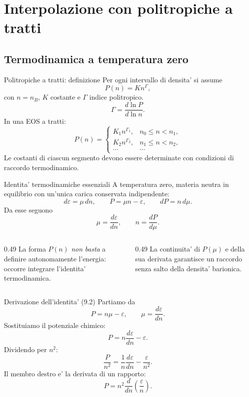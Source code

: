 \section{Interpolazione con politropiche a tratti}
\subsection{Termodinamica a temperatura zero}

\begin{frame}{Politropiche a tratti: definizione}
\small
Per ogni intervallo di densita' si assume
\[
{P(n)=Kn^{\Gamma}},
\]
con $n=n_B$, $K$ costante e $\Gamma$ indice politropico.
\[
\Gamma=\frac{d\ln P}{d\ln n}.
\]
In una EOS a tratti:
\[
P(n)=\begin{cases}
K_1n^{\Gamma_1},&n_0\leq n<n_1,\\
K_2n^{\Gamma_2},&n_1\leq n<n_2,\\
\cdots&\cdots
\end{cases}
\]
Le costanti di ciascun segmento devono essere determinate con condizioni di raccordo termodinamico.
\end{frame}

\begin{frame}{Identita' termodinamiche essenziali}
\small
A temperatura zero, materia neutra in equilibrio con un'unica carica conservata indipendente:
\[
d\varepsilon=\mu\,dn,\qquad
P=\mu n-\varepsilon,\qquad dP=n\,d\mu.
\]
Da esse seguono
\[
{\mu=\frac{d\varepsilon}{dn}},
\qquad
{n=\frac{dP}{d\mu}}.
\]
\begin{columns}[T,onlytextwidth]
\begin{column}{0.49\textwidth}
La forma $P(n)$ \emph{non basta} a definire autonomamente l'energia: occorre integrare l'identita' termodinamica.
\end{column}
\begin{column}{0.49\textwidth}
La continuita' di $P(\mu)$ e della sua derivata garantisce un raccordo senza salto della densita' barionica.
\end{column}
\end{columns}
\end{frame}

\begin{frame}{Derivazione dell'identita' (9.2)}
\small
Partiamo da
\[
P=n\mu-\varepsilon,
\qquad\mu=\frac{d\varepsilon}{dn}.
\]
Sostituiamo il potenziale chimico:
\[
P=n\frac{d\varepsilon}{dn}-\varepsilon.
\]
Dividendo per $n^2$:
\[
\frac P{n^2}=\frac1n\frac{d\varepsilon}{dn}-\frac{\varepsilon}{n^2}.
\]
Il membro destro e' la derivata di un rapporto:
\[
{P=n^2\frac{d}{dn}\left(\frac{\varepsilon}{n}\right).}
\]
\end{frame}

